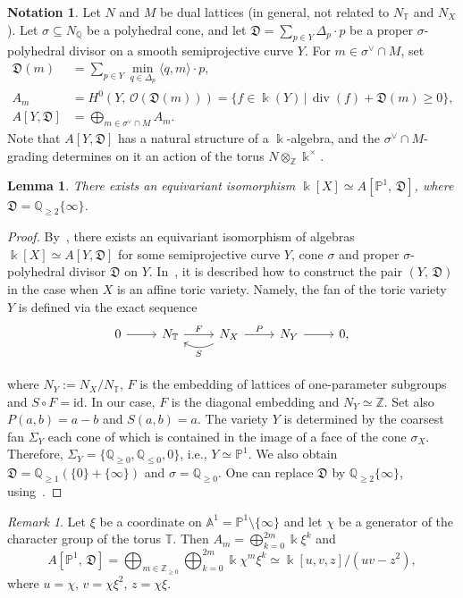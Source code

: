 \documentclass[a4paper,reqno,12pt]{amsart}
\theoremstyle{plain}
\theoremstyle{definition}
\newtheorem{notations}[theorem]{Notation}
\theoremstyle{plain}
\newtheorem{lemma}[theorem]{Lemma}
\theoremstyle{remark}
\newtheorem{remark}[theorem]{Remark}
\newcommand{\A}{\mathbb A}
\newcommand{\TT}{\mathbb{T}}
\newcommand{\ZZ}{\mathbb Z}
\newcommand{\QQ}{\mathbb Q}
\newcommand{\DD}{\mathfrak D}
\newcommand{\OO}{\mathcal O}
\newcommand{\PP}{\mathbb P}
\newcommand{\kk}{\Bbbk}
\DeclareMathOperator{\divisor}{div}
\newcommand{\id}{\mathrm{id}}
\begin{document}
\begin{notations}
    Let $N$ and $M$ be dual lattices (in general, not related to $N_{\TT}$ and $N_X$). Let $\sigma\subseteq N_\QQ$ be a polyhedral cone, and let $\DD=\sum_{p\in Y} \Delta_p\cdot p$ be a proper $\sigma$-polyhedral divisor on a smooth semiprojective curve $Y$. For $m\in \sigma^\vee\cap M$, set
    \begin{equation*}
        \begin{split}
            \DD(m)&=\sum_{p\in Y} \min_{q\in\Delta_p}\langle q, m\rangle\cdot p,\\
            A_m&=H^{0}(Y,\, \OO(\DD(m)))= \{f\in\Bbbk(Y)\,|\,\divisor (f)+\DD(m)\ge0\},\\
            A[Y,\DD] &=\bigoplus_{m\in\sigma^\vee\cap M}A_m. 
        \end{split}
    \end{equation*}
    Note that $A[Y,\DD]$ has a natural structure of a $\kk$-algebra, and the $\sigma^\vee\cap M$-grading determines on it an action of the torus $N\otimes_{\ZZ} \Bbbk^\times$.
\end{notations}
\begin{lemma}\label{LemmaA[Z,D]}
There exists an equivariant isomorphism $\Bbbk[X]\simeq A[\PP^1,\,\DD]$, where $\DD=\QQ_{\ge 2}\{\infty\}$.
\end{lemma}
\begin{proof}
    By~\cite[Theorem 1.2]{AL}, there exists an equivariant isomorphism of algebras $\Bbbk[X]\simeq A[Y,\DD]$ for some semiprojective curve $Y$, cone $\sigma$ and proper $\sigma$-polyhedral divisor $\DD$ on $Y$. In~\cite[Section~11]{Altmann-Hausen}, it is described how to construct the pair $(Y,\,\DD)$ in the case when $X$ is an affine toric variety. Namely, the fan of the toric variety $Y$ is defined via the exact sequence
    \[
    \begin{tikzcd}
        0 \arrow[r] &N_{\TT} \arrow[r, "F"]  &N_X \arrow[l, bend left,  "S"] \arrow[r,"P"] &N_Y \arrow[r] &0,\\
    \end{tikzcd}
    \]
    where $N_Y:= N_X/N_{\TT}$, $F$ is the embedding of lattices of one-parameter subgroups
    and $S\circ F=\id$. In our case, $F$ is the diagonal embedding and $N_Y\simeq \ZZ$. Set also $P(a,b)=a-b$ and $S(a,b)=a$. The variety $Y$ is determined by the coarsest fan $\Sigma_Y$ each cone of which is contained in the image of a face of the cone $\sigma_X$. Therefore, $\Sigma_Y=\{\QQ_{\ge0}, \QQ_{\le0}, 0\}$, i.e., $Y\simeq\PP^1$. We also obtain $\DD=\QQ_{\ge1}(\{0\}+\{\infty\})$ and $\sigma=\QQ_{\ge0}$. One can replace $\DD$ by $\QQ_{\ge 2}\{\infty\}$, using~\cite[Corollary~1.3]{AL}.
\end{proof}
\begin{remark}\label{RemarkA[Z,D]}
    Let $\xi$ be a coordinate on $\A^1=\PP^1\setminus\{\infty\}$ and let $\chi$ be a generator of the character group of the torus ${\TT}$.  Then $A_m=\bigoplus_{k=0}^{2m}\Bbbk\xi^k$ and $$A[\PP^1,\,\DD]=\bigoplus_{m\in\ZZ_{\ge0}}\bigoplus_{k=0}^{2m}\Bbbk\chi^m\xi^k\simeq \Bbbk[u,v,z]/(uv-z^2),$$ where $u=\chi,\,v=\chi\xi^2,\,z=\chi\xi$.
\end{remark}
\end{document}
